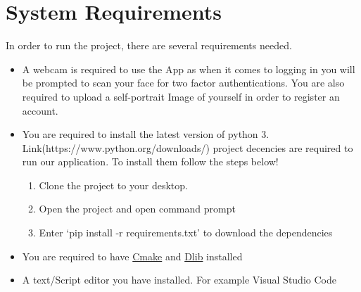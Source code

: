 \documentclass{article}
\begin{document}
\section{System Requirements}
In order to run the project, there are several requirements needed.
\begin{itemize}
  \item A webcam is required to use the App as when it comes to logging in you will be prompted to scan your face for two factor authentications.  You are also required to upload a self-portrait Image of yourself in order to register an account.
  \item You are required to install the latest version of python 3. Link(https://www.python.org/downloads/)
  \itemThe project decencies are required to run our application. To install them follow the steps below! 
    \begin{enumerate}
    \item Clone the project to your desktop.
    \item Open the project and open command prompt
    \item Enter ‘pip install -r requirements.txt’ to download the dependencies
    \end{enumerate}
  \item You are required to have \href{https://cmake.org/}{Cmake} and \href{http://dlib.net/}{Dlib} installed
  \item A text/Script editor you have installed. For example Visual Studio Code
\end{itemize}
\end{document}
